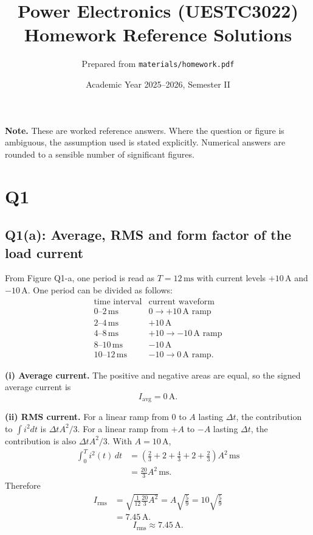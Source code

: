 \documentclass[11pt,a4paper]{article}
\title{Power Electronics (UESTC3022)\\Homework Reference Solutions}
\author{Prepared from \texttt{materials/homework.pdf}}
\date{Academic Year 2025--2026, Semester II}
\newcommand{\rms}{\mathrm{rms}}
\newcommand{\avg}{\mathrm{avg}}
\newcommand{\unit}[1]{\,\mathrm{#1}}
\newcommand{\answerbox}[1]{\[\boxed{#1}\]}
\begin{document}
\maketitle

\textbf{Note.} These are worked reference answers. Where the question or figure is ambiguous, the assumption used is stated explicitly. Numerical answers are rounded to a sensible number of significant figures.

\section*{Q1}

\subsection*{Q1(a): Average, RMS and form factor of the load current}

From Figure Q1-a, one period is read as $T=12\unit{ms}$ with current levels $+10\unit{A}$ and $-10\unit{A}$. One period can be divided as follows:
\[
\begin{array}{c|c}
\text{time interval} & \text{current waveform} \\
\hline
0\text{--}2\unit{ms} & 0\to +10\unit{A}\text{ ramp} \\
2\text{--}4\unit{ms} & +10\unit{A} \\
4\text{--}8\unit{ms} & +10\to -10\unit{A}\text{ ramp} \\
8\text{--}10\unit{ms} & -10\unit{A} \\
10\text{--}12\unit{ms} & -10\to 0\unit{A}\text{ ramp}.
\end{array}
\]

\textbf{(i) Average current.} The positive and negative areas are equal, so the signed average current is
\answerbox{I_{\avg}=0\unit{A}.}

\textbf{(ii) RMS current.} For a linear ramp from $0$ to $A$ lasting $\Delta t$, the contribution to $\int i^2dt$ is $\Delta t A^2/3$. For a linear ramp from $+A$ to $-A$ lasting $\Delta t$, the contribution is also $\Delta t A^2/3$. With $A=10\unit{A}$,
\begin{align*}
\int_0^T i^2(t)\,dt
&=\left(\frac{2}{3}+2+\frac{4}{3}+2+\frac{2}{3}\right)A^2 \unit{ms} \\
&=\frac{20}{3}A^2\unit{ms}.
\end{align*}
Therefore
\begin{align*}
I_{\rms}
&=\sqrt{\frac{1}{12}\frac{20}{3}A^2}
=A\sqrt{\frac{5}{9}}
=10\sqrt{\frac{5}{9}} \\
&=7.45\unit{A}.
\end{align*}
\answerbox{I_{\rms}\approx 7.45\unit{A}.}
\end{document}
